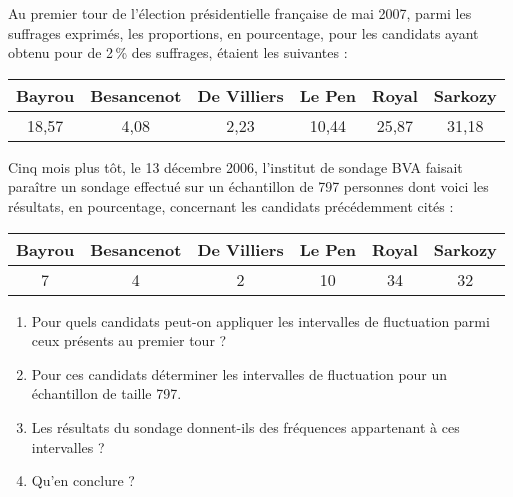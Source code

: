 \begin{exo}
 Au premier tour de l'\'election pr\'esidentielle fran\c caise de mai 2007, parmi les suffrages exprim\'es, les proportions, en pourcentage, pour les candidats ayant obtenu pour de 2\,\% des suffrages, \'etaient les suivantes :
 \vspace{-1em}\begin{center}
               \begin{tabular}{c|c|c|c|c|c}
                Bayrou & Besancenot & De Villiers & Le Pen & Royal & Sarkozy \\ \hline
		18,57	& 4,08	    & 2,23	  & 10,44  & 25,87 & 31,18
               \end{tabular}
              \end{center}
 Cinq mois plus t\^ot, le 13 d\'ecembre 2006, l'institut de sondage BVA faisait para\^itre un sondage effectu\'e sur un \'echantillon de 797 personnes dont voici les r\'esultats, en pourcentage, concernant les candidats pr\'ec\'edemment cit\'es :
\vspace{-1em}\begin{center}
               \begin{tabular}{c|c|c|c|c|c}
                Bayrou & Besancenot & De Villiers & Le Pen & Royal & Sarkozy \\ \hline
		7	& 4	    & 2	  & 10  & 34 & 32
               \end{tabular}
              \end{center}
  \begin{enumerate}
   \item Pour quels candidats peut-on appliquer les intervalles de fluctuation parmi ceux pr\'esents au premier tour ?
   \item Pour ces candidats d\'eterminer les intervalles de fluctuation pour un \'echantillon de taille 797.
   \item Les r\'esultats du sondage donnent-ils des fr\'equences appartenant \`a ces intervalles ?
   \item Qu'en conclure ?
  \end{enumerate}

\end{exo}

\sautpage

